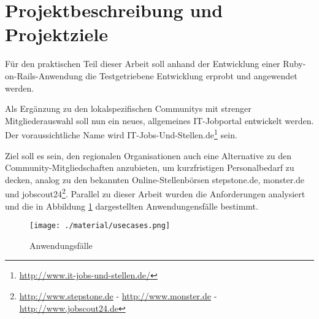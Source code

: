 \section{Projektbeschreibung und Projektziele}
Für den praktischen Teil dieser Arbeit soll anhand der Entwicklung einer Ruby-on-Rails\hyp{}Anwendung die Testgetriebene Entwicklung erprobt und angewendet werden.

Als Ergänzung zu den lokalspezifischen Communitys mit strenger Mitgliederauswahl soll nun ein neues, allgemeines IT-Jobportal entwickelt werden. Der voraussichtliche Name wird IT-Jobs-Und-Stellen.de\footnote{\url{http://www.it-jobs-und-stellen.de/}} sein.

Ziel soll es sein, den regionalen Organisationen auch eine Alternative zu den Community-Mitgliedschaften anzubieten, um kurzfristigen Personalbedarf zu decken, analog zu den bekannten Online-Stellenbörsen stepstone.de, monster.de und jobscout24\footnote{\url{http://www.stepstone.de} - \url{http://www.monster.de} - \url{http://www.jobscout24.de}}. Parallel zu dieser Arbeit wurden die Anforderungen analysiert und die in Abbildung \ref{fig:usecases} dargestellten Anwendungensfälle bestimmt.


\begin{figure}[htbp]
 \centering
 \texttt{[image: ./material/usecases.png]}
 \caption{Anwendungsfälle}
 \label{fig:usecases}
\end{figure}


